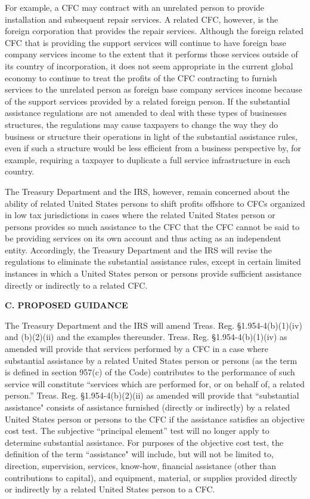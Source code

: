 \begin{select}
For example, a CFC may contract with an unrelated person to provide installation and subsequent repair services. A related CFC, however, is the foreign corporation that provides the repair services. Although the foreign related CFC that is providing the support services will continue to have foreign base company services income to the extent that it performs those services outside of its country of incorporation, it does not seem appropriate in the current global economy to continue to treat the profits of the CFC contracting to furnish services to the unrelated person as foreign base company services income because of the support services provided by a related foreign person. If the substantial assistance regulations are not amended to deal with these types of businesses structures, the regulations may cause taxpayers to change the way they do business or structure their operations in light of the substantial assistance rules, even if such a structure would be less efficient from a business perspective by, for example, requiring a taxpayer to duplicate a full service infrastructure in each country.

The Treasury Department and the IRS, however, remain concerned about the ability of related United States persons to shift profits offshore to CFCs organized in low tax jurisdictions in cases where the related United States person or persons provides so much assistance to the CFC that the CFC cannot be said to be providing services on its own account and thus acting as an independent entity. Accordingly, the Treasury Department and the IRS will revise the regulations to eliminate the substantial assistance rules, except in certain limited instances in which a United States person or persons provide sufficient assistance directly or indirectly to a related CFC.

\begin{center}
\textbf{C. PROPOSED GUIDANCE}
\end{center}

The Treasury Department and the IRS will amend Treas. Reg. \S 1.954-4(b)(1)(iv) and (b)(2)(ii) and the examples thereunder. Treas. Reg. \S 1.954-4(b)(1)(iv) as amended will provide that services performed by a CFC in a case where substantial assistance by a related United States person or persons (as the term is defined in section 957(c) of the Code) contributes to the performance of such service will constitute ``services which are performed for, or on behalf of, a related person.'' Treas. Reg. \S 1.954-4(b)(2)(ii) as amended will provide that ``substantial assistance" consists of assistance furnished (directly or indirectly) by a related United States person or persons to the CFC if the assistance satisfies an objective cost test. The subjective ``principal element'' test will no longer apply to determine substantial assistance. For purposes of the objective cost test, the definition of the term ``assistance" will include, but will not be limited to, direction, supervision, services, know-how, financial assistance (other than contributions to capital), and equipment, material, or supplies provided directly or indirectly by a related United States person to a CFC.


\end{select}
